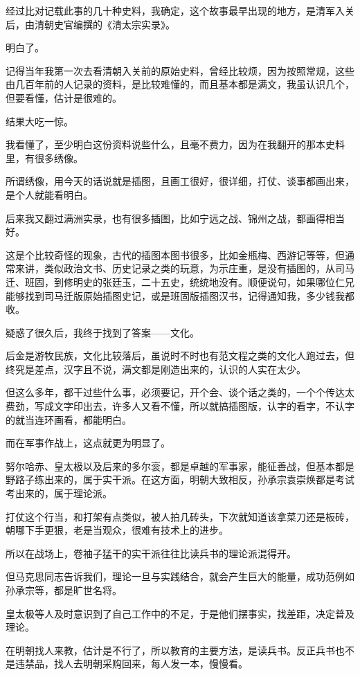 \begin{multicols}{\theparacolNo}
		经过比对记载此事的几十种史料，我确定，这个故事最早出现的地方，是清军入关后，由清朝史官编撰的《清太宗实录》。

		明白了。

		记得当年我第一次去看清朝入关前的原始史料，曾经比较烦，因为按照常规，这些由几百年前的人记录的资料，是比较难懂的，而且基本都是满文，我虽认识几个，但要看懂，估计是很难的。

		结果大吃一惊。

		我看懂了，至少明白这份资料说些什么，且毫不费力，因为在我翻开的那本史料里，有很多绣像。

		所谓绣像，用今天的话说就是插图，且画工很好，很详细，打仗、谈事都画出来，是个人就能看明白。

		后来我又翻过满洲实录，也有很多插图，比如宁远之战、锦州之战，都画得相当好。

		这是个比较奇怪的现象，古代的插图本图书很多，比如金瓶梅、西游记等等，但通常来讲，类似政治文书、历史记录之类的玩意，为示庄重，是没有插图的，从司马迁、班固，到修明史的张廷玉，二十五史，统统地没有。顺便说句，如果哪位仁兄能够找到司马迁版原始插图史记，或是班固版插图汉书，记得通知我，多少钱我都收。

		疑惑了很久后，我终于找到了答案——文化。

		后金是游牧民族，文化比较落后，虽说时不时也有范文程之类的文化人跑过去，但终究是差点，汉字且不说，满文都是刚造出来的，认识的人实在太少。

		但这么多年，都干过些什么事，必须要记，开个会、谈个话之类的，一个个传达太费劲，写成文字印出去，许多人又看不懂，所以就搞插图版，认字的看字，不认字的就当连环画看，都能明白。

		而在军事作战上，这点就更为明显了。

		努尔哈赤、皇太极以及后来的多尔衮，都是卓越的军事家，能征善战，但基本都是野路子练出来的，属于实干派。在这方面，明朝大致相反，孙承宗袁崇焕都是考试考出来的，属于理论派。

		打仗这个行当，和打架有点类似，被人拍几砖头，下次就知道该拿菜刀还是板砖，朝哪下手更狠，老是当观众，很难有技术上的进步。

		所以在战场上，卷袖子猛干的实干派往往比读兵书的理论派混得开。

		但马克思同志告诉我们，理论一旦与实践结合，就会产生巨大的能量，成功范例如孙承宗等，都是旷世名将。

		皇太极等人及时意识到了自己工作中的不足，于是他们摆事实，找差距，决定普及理论。

		在明朝找人来教，估计是不行了，所以教育的主要方法，是读兵书。反正兵书也不是违禁品，找人去明朝采购回来，每人发一本，慢慢看。


\end{multicols}
